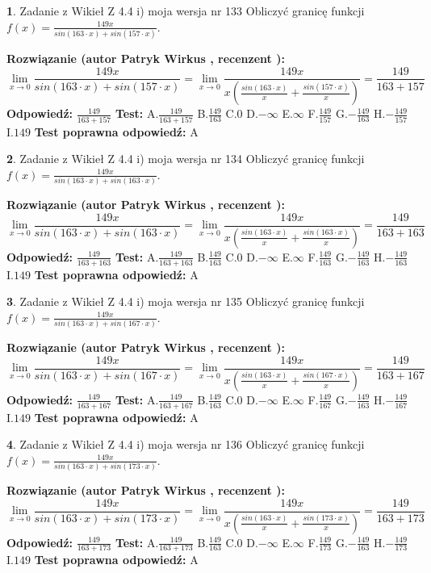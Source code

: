 \documentclass[12pt, a4paper]{article}
\theoremstyle{definition} %
\newtheorem{zad}{}
\newcommand{\zadStart}[1]{\begin{zad}#1\newline}
\newcommand{\zadStop}{\end{zad}}
\newcommand{\rozwStart}[2]{\noindent \textbf{Rozwiązanie (autor #1 , recenzent #2): }\newline}
\newcommand{\rozwStop}{\newline}
\newcommand{\odpStart}{\noindent \textbf{Odpowiedź:}\newline}
\newcommand{\odpStop}{\newline}
\newcommand{\testStart}{\noindent \textbf{Test:}\newline}
\newcommand{\testStop}{\newline}
\newcommand{\kluczStart}{\noindent \textbf{Test poprawna odpowiedź:}\newline}
\newcommand{\kluczStop}{\newline}
\begin{document}
\zadStart{Zadanie z Wikieł Z 4.4 i) moja wersja nr 133}
Obliczyć granicę funkcji $f(x)=\frac{149x}{sin(163\cdot x) +sin(157\cdot x)}$.
\zadStop
\rozwStart{Patryk Wirkus}{}
$$\lim\limits_{x\to 0}\frac{149x}{sin(163\cdot x) +sin(157\cdot x)}=\lim\limits_{x\to 0}\frac{149x}{x(\frac{sin(163\cdot x)}{x}+\frac{sin(157\cdot x)}{x})}=\frac{149}{163+157}$$
\rozwStop
\odpStart
$\frac{149}{163+157}$
\odpStop
\testStart
A.$\frac{149}{163+157}$
B.$\frac{149}{163}$
C.$0$
D.$-\infty$
E.$\infty$
F.$\frac{149}{157}$
G.$-\frac{149}{163}$
H.$-\frac{149}{157}$
I.$149$
\testStop
\kluczStart
A
\kluczStop



\zadStart{Zadanie z Wikieł Z 4.4 i) moja wersja nr 134}
Obliczyć granicę funkcji $f(x)=\frac{149x}{sin(163\cdot x) +sin(163\cdot x)}$.
\zadStop
\rozwStart{Patryk Wirkus}{}
$$\lim\limits_{x\to 0}\frac{149x}{sin(163\cdot x) +sin(163\cdot x)}=\lim\limits_{x\to 0}\frac{149x}{x(\frac{sin(163\cdot x)}{x}+\frac{sin(163\cdot x)}{x})}=\frac{149}{163+163}$$
\rozwStop
\odpStart
$\frac{149}{163+163}$
\odpStop
\testStart
A.$\frac{149}{163+163}$
B.$\frac{149}{163}$
C.$0$
D.$-\infty$
E.$\infty$
F.$\frac{149}{163}$
G.$-\frac{149}{163}$
H.$-\frac{149}{163}$
I.$149$
\testStop
\kluczStart
A
\kluczStop



\zadStart{Zadanie z Wikieł Z 4.4 i) moja wersja nr 135}
Obliczyć granicę funkcji $f(x)=\frac{149x}{sin(163\cdot x) +sin(167\cdot x)}$.
\zadStop
\rozwStart{Patryk Wirkus}{}
$$\lim\limits_{x\to 0}\frac{149x}{sin(163\cdot x) +sin(167\cdot x)}=\lim\limits_{x\to 0}\frac{149x}{x(\frac{sin(163\cdot x)}{x}+\frac{sin(167\cdot x)}{x})}=\frac{149}{163+167}$$
\rozwStop
\odpStart
$\frac{149}{163+167}$
\odpStop
\testStart
A.$\frac{149}{163+167}$
B.$\frac{149}{163}$
C.$0$
D.$-\infty$
E.$\infty$
F.$\frac{149}{167}$
G.$-\frac{149}{163}$
H.$-\frac{149}{167}$
I.$149$
\testStop
\kluczStart
A
\kluczStop



\zadStart{Zadanie z Wikieł Z 4.4 i) moja wersja nr 136}
Obliczyć granicę funkcji $f(x)=\frac{149x}{sin(163\cdot x) +sin(173\cdot x)}$.
\zadStop
\rozwStart{Patryk Wirkus}{}
$$\lim\limits_{x\to 0}\frac{149x}{sin(163\cdot x) +sin(173\cdot x)}=\lim\limits_{x\to 0}\frac{149x}{x(\frac{sin(163\cdot x)}{x}+\frac{sin(173\cdot x)}{x})}=\frac{149}{163+173}$$
\rozwStop
\odpStart
$\frac{149}{163+173}$
\odpStop
\testStart
A.$\frac{149}{163+173}$
B.$\frac{149}{163}$
C.$0$
D.$-\infty$
E.$\infty$
F.$\frac{149}{173}$
G.$-\frac{149}{163}$
H.$-\frac{149}{173}$
I.$149$
\testStop
\kluczStart
A
\kluczStop
\end{document}
